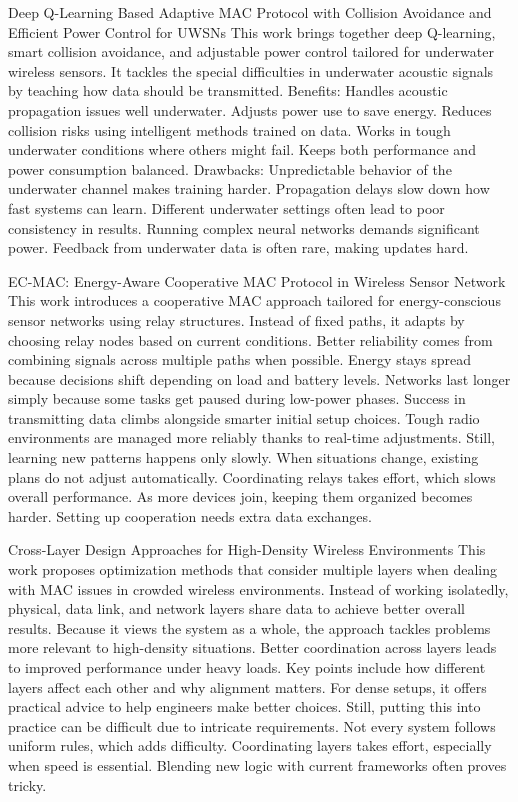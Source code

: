 \documentclass[a4paper,fleqn]{cas-dc}
\numberwithin{equation}{section}
\begin{document}
Deep Q-Learning Based Adaptive MAC Protocol with Collision Avoidance and Efficient Power Control for UWSNs
This work brings together deep Q-learning, smart collision avoidance, and adjustable power control tailored for underwater wireless sensors. It tackles the special difficulties in underwater acoustic signals by teaching how data should be transmitted. Benefits: Handles acoustic propagation issues well underwater. Adjusts power use to save energy. Reduces collision risks using intelligent methods trained on data. Works in tough underwater conditions where others might fail. Keeps both performance and power consumption balanced. Drawbacks: Unpredictable behavior of the underwater channel makes training harder. Propagation delays slow down how fast systems can learn. Different underwater settings often lead to poor consistency in results. Running complex neural networks demands significant power. Feedback from underwater data is often rare, making updates hard.\cite{Rahman2025}

EC-MAC: Energy-Aware Cooperative MAC Protocol in Wireless Sensor Network
This work introduces a cooperative MAC approach tailored for energy-conscious sensor networks using relay structures. Instead of fixed paths, it adapts by choosing relay nodes based on current conditions. Better reliability comes from combining signals across multiple paths when possible. Energy stays spread because decisions shift depending on load and battery levels. Networks last longer simply because some tasks get paused during low-power phases. Success in transmitting data climbs alongside smarter initial setup choices. Tough radio environments are managed more reliably thanks to real-time adjustments. Still, learning new patterns happens only slowly. When situations change, existing plans do not adjust automatically. Coordinating relays takes effort, which slows overall performance. As more devices join, keeping them organized becomes harder. Setting up cooperation needs extra data exchanges.\cite{Elshabasy2025224}


Cross-Layer Design Approaches for High-Density Wireless Environments
This work proposes optimization methods that consider multiple layers when dealing with MAC issues in crowded wireless environments. Instead of working isolatedly, physical, data link, and network layers share data to achieve better overall results. Because it views the system as a whole, the approach tackles problems more relevant to high-density situations. Better coordination across layers leads to improved performance under heavy loads. Key points include how different layers affect each other and why alignment matters. For dense setups, it offers practical advice to help engineers make better choices. Still, putting this into practice can be difficult due to intricate requirements. Not every system follows uniform rules, which adds difficulty. Coordinating layers takes effort, especially when speed is essential. Blending new logic with current frameworks often proves tricky.\cite{Khamzaev2025498}
\end{document}

